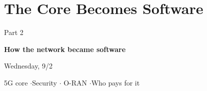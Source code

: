
\section[5G Core]{The Core Becomes Software}


\begin{frame}[plain]
  \vspace{1.4em}
  \centering
  {\Large\textcolor{softgray}{Part 2}\par}
  \vspace{0.7em}
  {\Huge\textbf{How the network became software}\par}
  \vspace{1.2em}
  {\large Wednesday, 9/2\par}
  \vspace{2.0em}
  {\normalsize\textcolor{softgray}{5G core \quad$\cdot$\quad Security \quad$\cdot$\quad
   O-RAN \quad$\cdot$\quad Who pays for it}\par}
\end{frame}

